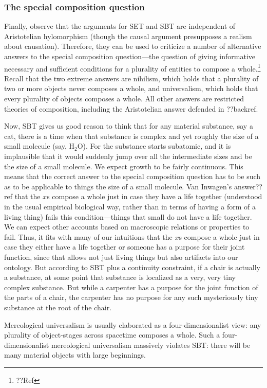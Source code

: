 \subsubsection{The special composition question}
Finally, observe that the arguments for SET and SBT are independent of Aristotelian hylomorphism (though the 
causal argument presupposes a realism about causation). Therefore, they can be used
to criticize a number of alternative answers to the special composition question---the question of giving informative 
necessary and sufficient conditions for a plurality of entities to compose a whole.\footnote{??Ref}  
Recall that the two extreme answers are nihilism, which holds that a plurality of two or more objects never 
composes a whole, and universalism, which holds that every plurality of objects composes a whole. All other answers are  restricted theories of composition, including the Aristotelian answer defended in 
??backref.

Now, SBT gives us good reason to think that for any material substance, say a cat, there is a time when 
that substance is complex and yet roughly the size of a small molecule (say, H$_2$O). For the substance starts subatomic, 
and it is implausible that it would suddenly jump over all the intermediate sizes and be the size of a small molecule.
We expect growth to be fairly continuous. This means that the correct answer to the special composition question
has to be such as to be applicable to things the size of a small molecule. Van Inwagen's answer??ref that the $x$s compose
a whole just in case they have a life together (understood in the usual empirical biological way, rather than in terms of having 
a form of a living thing) fails this condition---things that small do not have a life together. We can expect other 
accounts based on macroscopic relations or properties to fail. Thus, it fits with many of our intuitions that the $x$s 
compose a whole just in case they either have a life together or someone has a purpose for their joint function, since
that allows not just living things but also artifacts into our ontology. But according to SBT plus a continuity constraint,
if a chair is actually a substance, at some point that substance is localized as a very, very tiny complex substance.
But while a carpenter has a purpose for the joint function of the parts of a chair, the carpenter has no purpose for any 
such mysteriously tiny substance at the root of the chair. 

Mereological universalism is usually elaborated as a four-dimensionalist view: any plurality of object-stages across 
spacetime composes a whole. Such a four-dimensionalist mereological universalism massively violates SBT: there will be 
many material objects with large beginnings. 


